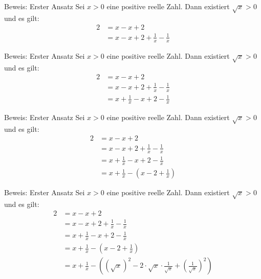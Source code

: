 \documentclass[10pt]{beamer}
\begin{document}
\begin{frame}{Beweis: Erster Ansatz}
    Sei \( x > 0 \) eine positive reelle Zahl. Dann existiert \( \sqrt{x} > 0 \) und es gilt:
    \begin{align*}
        2
        & = x - x + 2 \\
        & = x - x + 2 + \frac{1}{x} - \frac{1}{x}
    \end{align*}
\end{frame}



\begin{frame}{Beweis: Erster Ansatz}
    Sei \( x > 0 \) eine positive reelle Zahl. Dann existiert \( \sqrt{x} > 0 \) und es gilt:
    \begin{align*}
        2
        & = x - x + 2 \\
        & = x - x + 2 + \frac{1}{x} - \frac{1}{x} \\
        & = x + \frac{1}{x} - x + 2 - \frac{1}{x}
    \end{align*}
\end{frame}



\begin{frame}{Beweis: Erster Ansatz}
    Sei \( x > 0 \) eine positive reelle Zahl. Dann existiert \( \sqrt{x} > 0 \) und es gilt:
    \begin{align*}
        2
        & = x - x + 2 \\
        & = x - x + 2 + \frac{1}{x} - \frac{1}{x} \\
        & = x + \frac{1}{x} - x + 2 - \frac{1}{x} \\
        & = x + \frac{1}{x} - \left( x - 2 + \frac{1}{x} \right)
    \end{align*}
\end{frame}



\begin{frame}{Beweis: Erster Ansatz}
    Sei \( x > 0 \) eine positive reelle Zahl. Dann existiert \( \sqrt{x} > 0 \) und es gilt:
    \begin{align*}
        2
        & = x - x + 2 \\
        & = x - x + 2 + \frac{1}{x} - \frac{1}{x} \\
        & = x + \frac{1}{x} - x + 2 - \frac{1}{x} \\
        & = x + \frac{1}{x} - \left( x - 2 + \frac{1}{x} \right) \\
        & = x + \frac{1}{x} - \left( \left( \sqrt{x} \right)^{2} - 2 \cdot \sqrt{x} \cdot \frac{1}{\sqrt{x}} + \left( \frac{1}{\sqrt{x}} \right)^{2} \right)
    \end{align*}
\end{frame}
\end{document}
